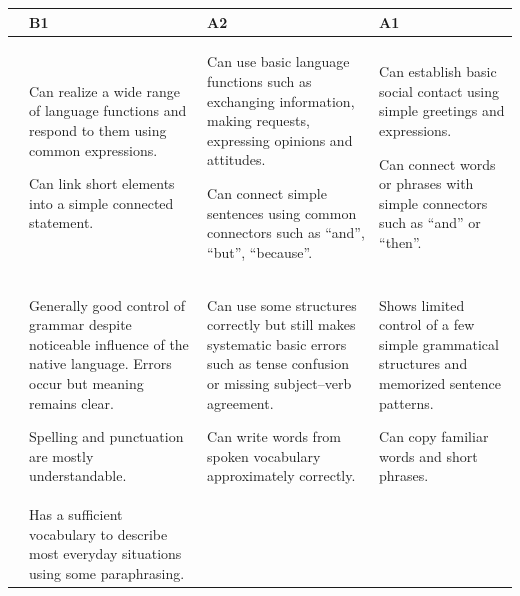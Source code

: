 \documentclass[a4paper,11pt]{article}
\begin{document}
        \begin{center}
            \footnotesize
            \begin{tabularx}{\textwidth}{|c|Y|Y|Y|}
    \hline
    
    & \textbf{B1} & \textbf{A2} & \textbf{A1} \\
    
    \hline
    
    
    &
    Can realize a wide range of language functions and respond to them using common expressions.
    
    Can link short elements into a simple connected statement.
    
    &
    Can use basic language functions such as exchanging information, making requests,
    expressing opinions and attitudes.
    
    Can connect simple sentences using common connectors such as ``and'', ``but'', ``because''.
    
    &
    Can establish basic social contact using simple greetings and expressions.
    
    Can connect words or phrases with simple connectors such as ``and'' or ``then''.
    
    \\
    \hline
    
    
    &
    Generally good control of grammar despite noticeable influence of the native language.
    Errors occur but meaning remains clear.
    
    Spelling and punctuation are mostly understandable.
    
    &
    Can use some structures correctly but still makes systematic basic errors such as tense confusion
    or missing subject–verb agreement.
    
    Can write words from spoken vocabulary approximately correctly.
    
    &
    Shows limited control of a few simple grammatical structures and memorized sentence patterns.
    
    Can copy familiar words and short phrases.
    
    \\
    \hline
    
    
    &
    Has a sufficient vocabulary to describe most everyday situations using some paraphrasing.
    

\end{tabularx}
\end{center}
\end{document}
